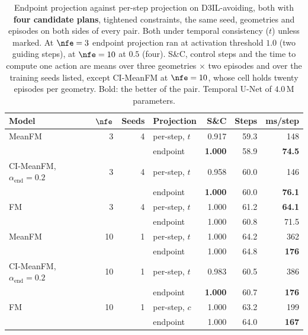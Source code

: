 \begin{table}[htpb]
  \caption[Endpoint against per-step projection at matched candidates]{Endpoint projection
  \parencite{li2025hardflow} against per-step projection on D3IL-avoiding, both with \textbf{four
  candidate plans}, tightened constraints, the same seed, geometries and episodes on both sides of every
  pair. Both under temporal consistency ($t$) unless marked. At $\nfe=3$ endpoint projection ran at activation threshold $1.0$ (two guiding
  steps), at $\nfe=10$ at $0.5$ (four). S\&C, control steps and the time to compute one action are means
  over three geometries $\times$ two episodes and over the training seeds listed, except CI-MeanFM at
  $\nfe=10$, whose cell holds twenty episodes per geometry. Bold: the better of the pair. Temporal U-Net of
  $4.0$\,M parameters.}
  \label{tab:avoiding-projectors}
  \centering
  \footnotesize
  \setlength{\tabcolsep}{4pt}
  \begin{tabularx}{\linewidth}{@{}L r r L rrr@{}}
    \toprule
    Model & $\nfe$ & Seeds & Projection & S\&C & Steps & ms/step \\
    \midrule
    MeanFM    & 3  & 4 & per-step, $t$ & 0.917 & 59.3 & 148 \\
              &    &       & endpoint      & \textbf{1.000} & 58.9 & \textbf{74.5} \\
    CI-MeanFM, $\alpha_{\mathrm{end}}=0.2$ & 3 & 4 & per-step, $t$ & 0.958 & 60.0 & 146 \\
              &    &       & endpoint      & \textbf{1.000} & 60.0 & \textbf{76.1} \\
    FM        & 3  & 4     & per-step, $t$ & 1.000 & 61.2 & \textbf{64.1} \\
              &    &       & endpoint      & 1.000 & 60.8 & 71.5 \\
    \midrule
    MeanFM    & 10 & 1     & per-step, $t$ & 1.000 & 64.2 & 362 \\
              &    &       & endpoint      & 1.000 & 64.8 & \textbf{176} \\
    CI-MeanFM, $\alpha_{\mathrm{end}}=0.2$ & 10 & 1 & per-step, $t$ & 0.983 & 60.5 & 386 \\
              &    &       & endpoint      & \textbf{1.000} & 60.7 & \textbf{176} \\
    FM        & 10 & 1     & per-step, $c$ & 1.000 & 63.2 & 199 \\
              &    &       & endpoint      & 1.000 & 64.0 & \textbf{167} \\
    \bottomrule
  \end{tabularx}
\end{table}

